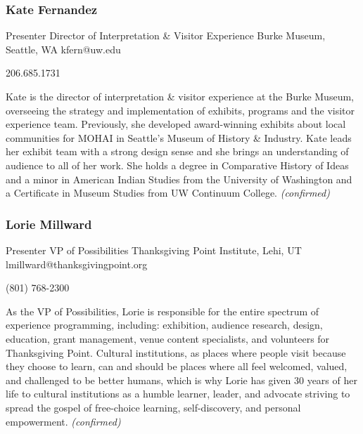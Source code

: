 \documentclass{report}
\begin{document}
              
                \subsubsection*{ Kate  Fernandez }
                Presenter\newline
                Director of Interpretation \& Visitor Experience\newline
                Burke Museum, Seattle, WA
                \newline
                kfern@uw.edu\newline
                
                206.685.1731   \newline

                Kate is the director of interpretation \& visitor experience at the Burke Museum, overseeing the strategy and implementation of exhibits, programs and the visitor experience team. Previously, she developed award-winning exhibits about local communities for MOHAI in Seattle’s Museum of History \& Industry. Kate leads her exhibit team with a strong design sense and she brings an understanding of audience to all of her work. She holds a degree in Comparative History of Ideas and a minor in American Indian Studies from the University of Washington and a Certificate in Museum Studies from UW Continuum College.
                \emph{ (confirmed) }
              

              
                \subsubsection*{ Lorie Millward }
                Presenter\newline
                VP of Possibilities\newline
                Thanksgiving Point Institute, Lehi, UT 
                \newline
                lmillward@thanksgivingpoint.org\newline
                
                (801) 768-2300 \newline

                As the VP of Possibilities, Lorie is responsible for the entire spectrum of experience programming, including: exhibition, audience research, design, education, grant management, venue content specialists, and volunteers for Thanksgiving Point. Cultural institutions, as places where people visit because they choose to learn, can and should be places where all feel welcomed, valued, and challenged to be better humans, which is why Lorie has given 30 years of her life to cultural institutions as a humble learner, leader, and advocate striving to spread the gospel of free-choice learning, self-discovery, and personal empowerment.
                \emph{ (confirmed) }
              
\end{document}
